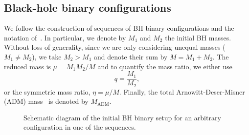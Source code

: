 \documentclass[floats,floatfix,showpacs,amssymb,prd,twocolumn,superscriptaddress,nofootinbib,nolongbibliography,reprint]{revtex4-2}
\begin{document}
\subsection{Black-hole binary configurations}
%
\label{sec:configs}
%
We follow the construction of sequences of BH binary configurations
and the notation of~\cite{Sperhake:2007gu}. In particular, we denote by $M_1$ 
and $M_2$ the initial BH masses. Without loss of generality, since 
we are only considering unequal masses ($M_1 \neq M_2$), we take $M_2 > M_1$
and denote their sum by $M = M_1 + M_2$. The reduced mass is 
$\mu = M_1 M_2 /M$ and to quantify the mass ratio, we either use
\begin{equation}
    q = \frac{M_1}{M_2},
    \label{eq:mass-ratio}
\end{equation}
or the symmetric mass ratio, $\eta = \mu/M$. Finally, the 
total Arnowitt-Deser-Misner (ADM) mass~\cite{Arnowitt:1962hi} is denoted by 
$M_{\mathrm{ADM}}$.

\begin{figure}[t]
    \centering
    
        
        	
        
        	
    \caption{Schematic diagram of the initial BH binary setup for 
    an arbitrary configuration in one of the sequences.}
    \label{fig:bh-setup}
\end{figure}
\end{document}
